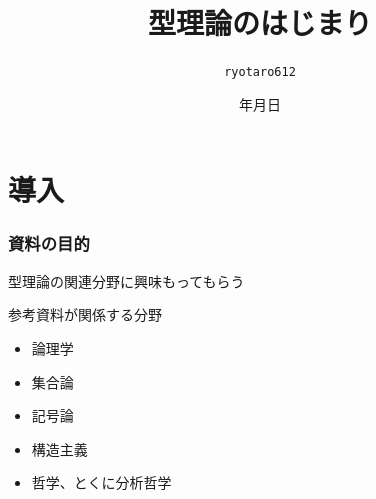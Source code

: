 \documentclass[unicode, 14pt, aspectratio=169]{beamer}
\date{\number\year 年\number\month 月\number\day 日}
\title{型理論のはじまり}
\author{\texttt{ryotaro612}}
\begin{document}
\newcommand\blfootnote[1]{
    \begingroup
    \renewcommand\thefootnote{}\footnote{#1}
    \addtocounter{footnote}{-1}
    \endgroup
}

\begin{frame}
\titlepage
\end{frame}
\section{導入}
\begin{frame}
  \frametitle{資料の目的}
  {\large 型理論の関連分野に興味もってもらう}
  \par
  \vspace{16pt}
  参考資料が関係する分野
  \begin{itemize}
  \item 論理学
  \item 集合論
  \item 記号論
  \item 構造主義
  \item 哲学、とくに分析哲学
  \end{itemize}
\end{frame}
\end{document}
